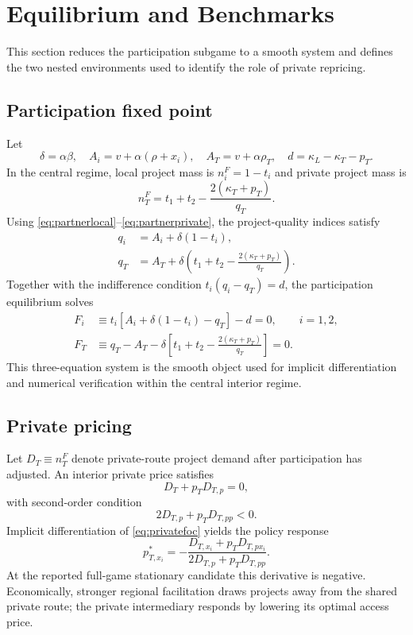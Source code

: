 \section{Equilibrium and Benchmarks}\label{sec:equilibrium}

This section reduces the participation subgame to a smooth system and defines the two nested environments used to identify the role of private repricing.

\subsection{Participation fixed point}

Let
\[
\delta=\alpha\beta,\quad
A_i=v+\alpha(\rho+x_i),\quad
A_T=v+\alpha\rho_T,\quad
d=\kappa_L-\kappa_T-p_T .
\]
In the central regime, local project mass is $n_i^F=1-t_i$ and private project mass is
\[
n_T^F=t_1+t_2-\frac{2(\kappa_T+p_T)}{q_T}.
\]
Using \eqref{eq:partnerlocal}--\eqref{eq:partnerprivate}, the project-quality indices satisfy
\begin{align}
q_i &= A_i+\delta(1-t_i), \label{eq:qi}\\
q_T &= A_T+\delta\left(t_1+t_2-\frac{2(\kappa_T+p_T)}{q_T}\right). \label{eq:qT}
\end{align}
Together with the indifference condition $t_i(q_i-q_T)=d$, the participation equilibrium solves
\begin{align}
F_i &\equiv t_i\left[A_i+\delta(1-t_i)-q_T\right]-d=0,\qquad i=1,2, \label{eq:Fi}\\
F_T &\equiv q_T-A_T-\delta\left[t_1+t_2-\frac{2(\kappa_T+p_T)}{q_T}\right]=0. \label{eq:FT}
\end{align}
This three-equation system is the smooth object used for implicit differentiation and numerical verification within the central interior regime.

\subsection{Private pricing}

Let $D_T\equiv n_T^F$ denote private-route project demand after participation has adjusted. An interior private price satisfies
\begin{equation}
D_T+p_TD_{T,p}=0,
\label{eq:privatefoc}
\end{equation}
with second-order condition
\begin{equation}
2D_{T,p}+p_TD_{T,pp}<0.
\label{eq:privatesoc}
\end{equation}
Implicit differentiation of \eqref{eq:privatefoc} yields the policy response
\begin{equation}
p^*_{T,x_i}
=
-\frac{D_{T,x_i}+p_TD_{T,px_i}}
{2D_{T,p}+p_TD_{T,pp}}.
\label{eq:px}
\end{equation}
At the reported full-game stationary candidate this derivative is negative. Economically, stronger regional facilitation draws projects away from the shared private route; the private intermediary responds by lowering its optimal access price.

